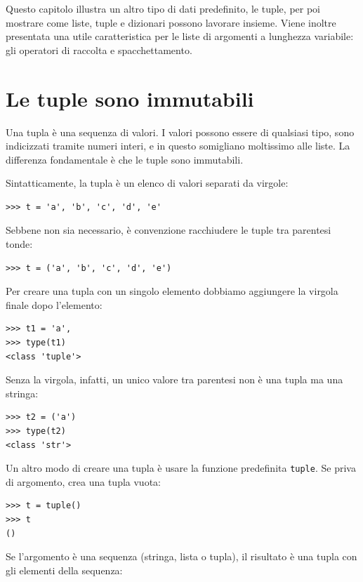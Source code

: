 \documentclass[10pt]{book}
\begin{document}
Questo capitolo illustra un altro tipo di dati predefinito, le tuple, per poi mostrare come liste, tuple e dizionari possono lavorare insieme. Viene inoltre presentata una utile caratteristica per le liste di argomenti a lunghezza variabile: gli operatori di raccolta e spacchettamento.

\section{Le tuple sono immutabili}

Una tupla è una sequenza di valori. I valori possono essere di qualsiasi tipo, sono indicizzati tramite numeri interi, e in questo somigliano moltissimo alle liste. La differenza fondamentale è che le tuple sono immutabili.

Sintatticamente, la tupla è un elenco di valori separati da virgole:

\begin{verbatim}
>>> t = 'a', 'b', 'c', 'd', 'e'
\end{verbatim}
%
Sebbene non sia necessario, è convenzione racchiudere le tuple tra
   parentesi tonde:

\begin{verbatim}
>>> t = ('a', 'b', 'c', 'd', 'e')
\end{verbatim}
%
Per creare una tupla con un singolo elemento dobbiamo aggiungere la
   virgola finale dopo l'elemento:

\begin{verbatim}
>>> t1 = 'a',
>>> type(t1)
<class 'tuple'>
\end{verbatim}
%
Senza la virgola, infatti, un unico valore tra parentesi non è una tupla ma una stringa:

\begin{verbatim}
>>> t2 = ('a')
>>> type(t2)
<class 'str'>
\end{verbatim}
%
Un altro modo di creare una tupla è usare la funzione predefinita {\tt tuple}.
Se priva di argomento, crea una tupla vuota:

\begin{verbatim}
>>> t = tuple()
>>> t
()
\end{verbatim}
%
Se l'argomento è una sequenza (stringa, lista o tupla), il risultato è una tupla con gli elementi della sequenza:
\end{document}

